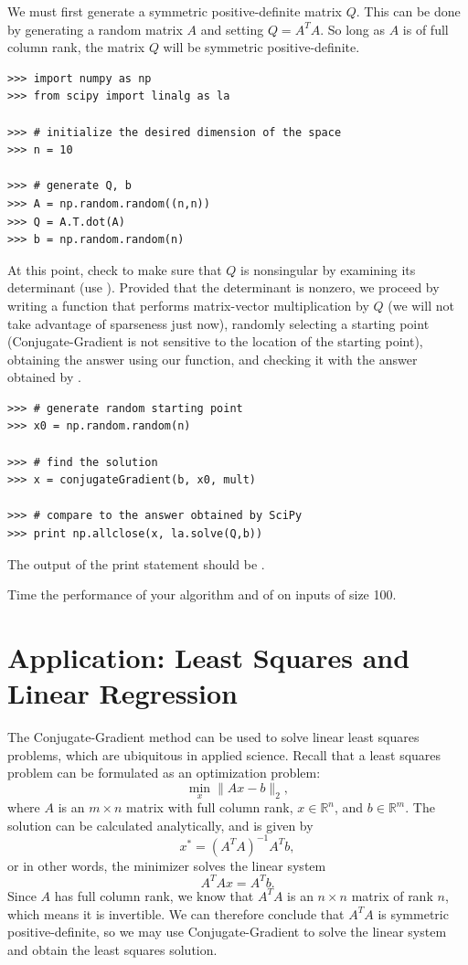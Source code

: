We must first generate a symmetric positive-definite matrix $Q$. This can be done by generating a random matrix $A$ and setting $Q = A^TA$.
So long as $A$ is of full column rank, the matrix $Q$ will be symmetric positive-definite.
\begin{lstlisting}
>>> import numpy as np
>>> from scipy import linalg as la

>>> # initialize the desired dimension of the space
>>> n = 10

>>> # generate Q, b
>>> A = np.random.random((n,n))
>>> Q = A.T.dot(A)
>>> b = np.random.random(n)
\end{lstlisting}
At this point, check to make sure that $Q$ is nonsingular by examining its determinant (use ).
Provided that the determinant is nonzero, we proceed by writing a function that performs matrix-vector multiplication by $Q$ (we
will not take advantage of sparseness just now), randomly selecting a starting point (Conjugate-Gradient is not sensitive to the location of
the starting point), obtaining the answer using our function, and checking it with the answer obtained by .
\begin{lstlisting}
>>> # generate random starting point
>>> x0 = np.random.random(n)

>>> # find the solution
>>> x = conjugateGradient(b, x0, mult)

>>> # compare to the answer obtained by SciPy
>>> print np.allclose(x, la.solve(Q,b))
\end{lstlisting}
The output of the print statement should be .

Time the performance of your algorithm and of  on inputs of size 100.

\section*{Application: Least Squares and Linear Regression}
The Conjugate-Gradient method can be used to solve linear least squares problems, which are ubiquitous in applied science.
Recall that a least squares problem can be formulated as an optimization problem:
\[
\min_x \|Ax - b\|_2,
\]
where $A$ is an $m \times n$ matrix with full column rank, $x \in \mathbb{R}^n$, and $b \in \mathbb{R}^m$. The solution can
be calculated analytically, and is given by
\[
x^* = (A^TA)^{-1}A^Tb,
\]
or in other words, the minimizer solves the linear system
\[
A^TAx = A^Tb.
\]
Since $A$ has full column rank, we know that $A^TA$ is an $n \times n$ matrix of rank $n$, which means it is invertible. We can
therefore conclude that $A^TA$ is symmetric positive-definite, so we may use Conjugate-Gradient to solve the linear system
and obtain the least squares solution.

